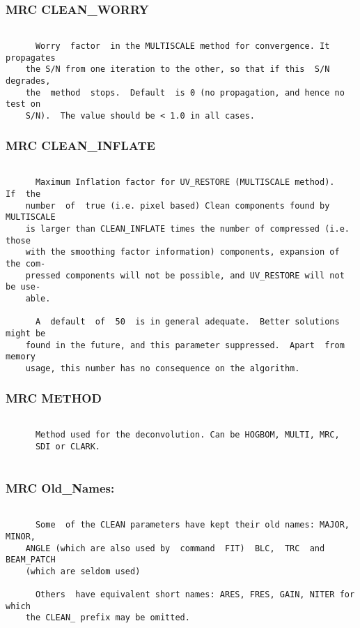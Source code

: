 \subsubsection{MRC CLEAN\_WORRY}
\begin{verbatim}

      Worry  factor  in the MULTISCALE method for convergence. It propagates
    the S/N from one iteration to the other, so that if this  S/N  degrades,
    the  method  stops.  Default  is 0 (no propagation, and hence no test on
    S/N).  The value should be < 1.0 in all cases.

\end{verbatim}
\subsubsection{MRC CLEAN\_INFLATE}
\begin{verbatim}

      Maximum Inflation factor for UV_RESTORE (MULTISCALE method).   If  the
    number  of  true (i.e. pixel based) Clean components found by MULTISCALE
    is larger than CLEAN_INFLATE times the number of compressed (i.e.  those
    with the smoothing factor information) components, expansion of the com-
    pressed components will not be possible, and UV_RESTORE will not be use-
    able.

      A  default  of  50  is in general adequate.  Better solutions might be
    found in the future, and this parameter suppressed.  Apart  from  memory
    usage, this number has no consequence on the algorithm.

\end{verbatim}
\subsubsection{MRC METHOD}
\begin{verbatim}

      Method used for the deconvolution. Can be HOGBOM, MULTI, MRC,
      SDI or CLARK.


\end{verbatim}
\subsubsection{MRC Old\_Names:}
\begin{verbatim}

      Some  of the CLEAN parameters have kept their old names: MAJOR, MINOR,
    ANGLE (which are also used by  command  FIT)  BLC,  TRC  and  BEAM_PATCH
    (which are seldom used)

      Others  have equivalent short names: ARES, FRES, GAIN, NITER for which
    the CLEAN_ prefix may be omitted.

\end{verbatim}
